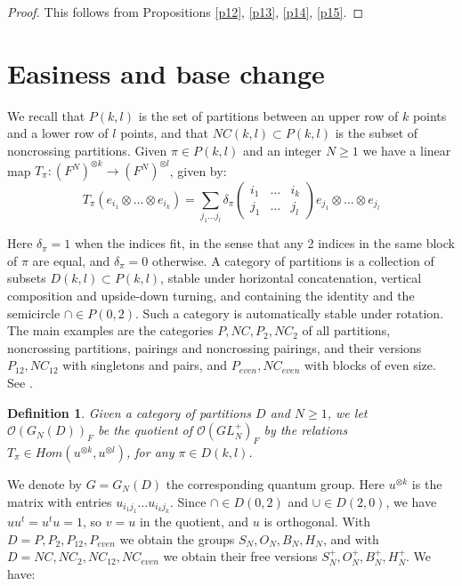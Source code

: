 \documentclass[11pt]{amsart}
\newtheorem{definition}[theorem]{Definition}
\theoremstyle{definition}
\begin{document}
\begin{proof}
This follows from Propositions \ref{p12}, \ref{p13}, \ref{p14}, \ref{p15}.
\end{proof}

\section{Easiness and base change}

We recall that $P(k,l)$ is the set of partitions between an upper row of $k$ points and a lower row of $l$ points, and that $NC(k,l)\subset P(k,l)$ is the subset of noncrossing partitions. Given $\pi\in P(k,l)$ and an integer $N\geq1$ we have a linear map $T_\pi:(F^N)^{\otimes k}\to(F^N)^{\otimes l}$, given by:
$$T_\pi(e_{i_1}\otimes\ldots\otimes e_{i_k})=\sum_{j_1\ldots j_l}\delta_\pi\begin{pmatrix}i_1&\ldots&i_k\\ j_1&\ldots&j_l\end{pmatrix}e_{j_1}\otimes\ldots\otimes e_{j_l}$$

Here $\delta_\pi=1$ when the indices fit, in the sense that any 2 indices in the same block of $\pi$ are equal, and $\delta_\pi=0$ otherwise. A category of partitions is a collection of subsets $D(k,l)\subset P(k,l)$, stable under horizontal concatenation, vertical composition and upside-down turning, and containing the identity and the semicircle $\cap\in P(0,2)$. Such a category is automatically stable under rotation. The main examples are the categories $P,NC,P_2,NC_2$ of all partitions, noncrossing partitions, pairings and noncrossing pairings, and their versions $P_{12},NC_{12}$ with singletons and pairs, and $P_{even},NC_{even}$ with blocks of even size. See \cite{bsp}.

\begin{definition}
Given a category of partitions $D$ and $N\geq1$, we let $\mathcal O(G_N(D))_F$ be the quotient of $\mathcal O(GL_N^+)_F$ by the relations $T_\pi\in Hom(u^{\otimes k},u^{\otimes l})$, for any $\pi\in D(k,l)$.
\end{definition}

We denote by $G=G_N(D)$ the corresponding quantum group. Here $u^{\otimes k}$ is the matrix with entries $u_{i_1j_1}\ldots u_{i_kj_k}$. Since $\cap\in D(0,2)$ and $\cup\in D(2,0)$, we have $uu^t=u^tu=1$, so $v=u$ in the quotient, and $u$ is orthogonal. With $D=P,P_2,P_{12},P_{even}$ we obtain the groups $S_N,O_N,B_N,H_N$, and with $D=NC,NC_2,NC_{12},NC_{even}$ we obtain their free versions $S_N^+,O_N^+,B_N^+,H_N^+$. We have:
\end{document}
